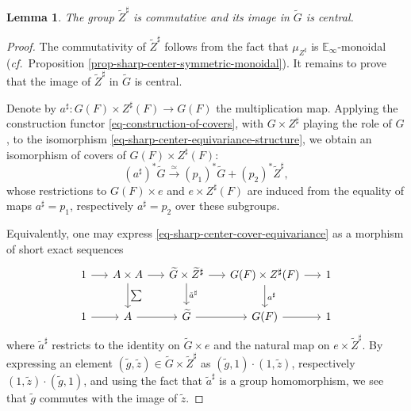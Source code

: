 \documentclass[10pt,english,reqno]{amsart}
\newtheorem{lem}[subsubsection]{Lemma}
\theoremstyle{definition}
\numberwithin{equation}{section}
\begin{document}

\begin{lem}
\label{lem-sharp-center-commutative}
The group $\widetilde Z^{\sharp}$ is commutative and its image in $\widetilde G$ is central.
\end{lem}
\begin{proof}
The commutativity of $\widetilde Z^{\sharp}$ follows from the fact that $\mu_{Z^{\sharp}}$ is $\mathbb E_{\infty}$-monoidal (\emph{cf.}~Proposition \ref{prop-sharp-center-symmetric-monoidal}). It remains to prove that the image of $\widetilde Z^{\sharp}$ in $\widetilde G$ is central.

Denote by $a^{\sharp} : G(F) \times Z^{\sharp}(F) \rightarrow G(F)$ the multiplication map. Applying the construction functor \eqref{eq-construction-of-covers}, with $G \times Z^{\sharp}$ playing the role of $G$, to the isomorphism \eqref{eq-sharp-center-equivariance-structure}, we obtain an isomorphism of covers of $G(F) \times Z^{\sharp}(F)$:
\begin{equation}
\label{eq-sharp-center-cover-equivariance}
(a^{\sharp})^*\widetilde G \xrightarrow{\simeq} (p_1)^*\widetilde G + (p_2)^*\widetilde Z^{\sharp},
\end{equation}
whose restrictions to $G(F) \times e$ and $e \times Z^{\sharp}(F)$ are induced from the equality of maps $a^{\sharp} = p_1$, respectively $a^{\sharp} = p_2$ over these subgroups.

Equivalently, one may express \eqref{eq-sharp-center-cover-equivariance} as a morphism of short exact sequences
$$
\begin{tikzcd}[column sep = 1.5em]
	1 \ar[r] & A \times A \ar[r]\ar[d, "\sum"] & \widetilde G \times \widetilde Z^{\sharp} \ar[r]\ar[d, "\tilde a^{\sharp}"] & G(F) \times Z^{\sharp}(F) \ar[r]\ar[d, "a^{\sharp}"] & 1 \\
	1 \ar[r] & A \ar[r] & \widetilde G \ar[r] & G(F) \ar[r] & 1
\end{tikzcd}
$$
where $\tilde a^{\sharp}$ restricts to the identity on $\widetilde G \times e$ and the natural map on $e \times \widetilde Z^{\sharp}$. By expressing an element $(\tilde g, \tilde z) \in \widetilde G \times \widetilde Z^{\sharp}$ as $(\tilde g, 1) \cdot (1, \tilde z)$, respectively $(1, \tilde z)\cdot(\tilde g, 1)$, and using the fact that $\tilde a^{\sharp}$ is a group homomorphism, we see that $\tilde g$ commutes with the image of $\tilde z$.
\end{proof}

\end{document}
